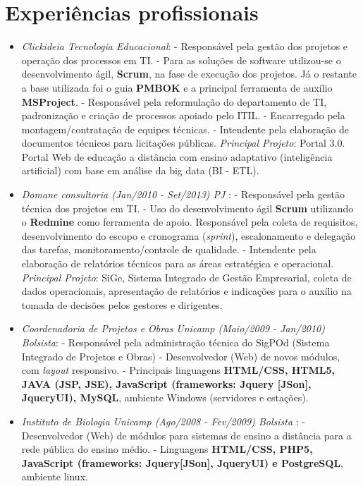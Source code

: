 \documentclass[a4paper,10pt]{article}
\begin{document}
\section{Experiências profissionais}
\begin{itemize}

\item \emph{Clickideia Tecnologia Educacional}: 
  \subitem - Responsável pela gestão dos projetos e operação dos processos em TI.
  \subitem - Para as soluções de software utilizou-se o desenvolvimento ágil, \textbf{Scrum}, na fase de execução dos projetos. Já o restante a base utilizada foi o guia \textbf{PMBOK} e a principal ferramenta de auxílio \textbf{MSProject}.
  \subitem - Responsável pela reformulação do departamento de TI, padronização e criação de processos apoiado pelo ITIL.
  \subitem - Encarregado pela montagem/contratação de equipes técnicas.
  \subitem - Intendente pela elaboração de documentos técnicos para licitações públicas.
  \subitem \emph{Principal Projeto}: Portal 3.0. Portal Web de educação a distância com ensino adaptativo (inteligência artificial) com base em análise da big data (BI - ETL).

\item \emph{Domane consultoria (Jan/2010 - Set/2013) PJ }: 
  \subitem - Responsável pela gestão técnica dos projetos em TI. 
  \subitem - Uso do desenvolvimento ágil \textbf{Scrum} utilizando o \textbf{Redmine} como ferramenta de apoio. Responsável pela coleta de requisitos, desenvolvimento do escopo e cronograma (\textit{sprint}), escalonamento e delegação das tarefas, monitoramento/controle de qualidade.
  \subitem - Intendente pela elaboração de relatórios técnicos para as áreas estratégica e operacional.
  \subitem \emph{Principal Projeto}:  SiGe, Sistema Integrado de Gestão Empresarial, coleta de dados operacionais, apresentação de relatórios e indicações para o auxílio na tomada de decisões pelos gestores e dirigentes.

\item \emph{Coordenadoria de Projetos e Obras Unicamp (Maio/2009 - Jan/2010) Bolsista}: 
  \subitem - Responsável pela administração técnica do SigPOd (Sistema Integrado de Projetos e Obras)
  \subitem - Desenvolvedor (Web) de novos módulos, com \textit{layout} responsivo.
  \subitem - Principais linguagens \textbf{HTML/CSS, HTML5, JAVA (JSP, JSE), JavaScript (frameworks: Jquery [JSon], JqueryUI), MySQL}, ambiente Windows (servidores e estações).
  
\item \emph{Instituto de Biologia Unicamp (Ago/2008 - Fev/2009) Bolsista }: 
  \subitem - Desenvolvedor (Web) de módulos para sistemas de ensino a distância para a rede pública do ensino médio.
  \subitem - Linguagens \textbf{HTML/CSS, PHP5, JavaScript (frameworks: Jquery[JSon], JqueryUI) e PostgreSQL}, ambiente linux.


\end{itemize}
\end{document}
